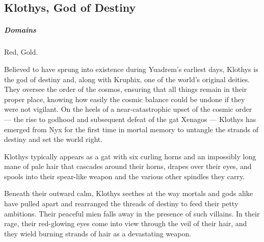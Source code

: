 \subsection*{Klothys, God of Destiny} \label{ssec::klothys}
    \subparagraph{Domains} Red, Gold.

    Believed to have sprung into existence during Yuadrem's earliest days, Klothys is the god of destiny and, along with Kruphix, one of the world's original deities.
    They oversee the order of the cosmos, ensuring that all things remain in their proper place, knowing how easily the cosmic balance could be undone if they were not vigilant.
    On the heels of a near-catastrophic upset of the cosmic order --- the rise to godhood and subsequent defeat of the gat Xenagos --- Klothys has emerged from Nyx for the first time in mortal memory to untangle the strands of destiny and set the world right.

    Klothys typically appears as a gat with six curling horns and an impossibly long mane of pale hair that cascades around their horns, drapes over their eyes, and spools into their spear-like weapon and the various other spindles they carry.

    Beneath their outward calm, Klothys seethes at the way mortals and gods alike have pulled apart and rearranged the threads of destiny to feed their petty ambitions.
    Their peaceful mien falls away in the presence of such villains.
    In their rage, their red-glowing eyes come into view through the veil of their hair, and they wield burning strands of hair as a devastating weapon.

